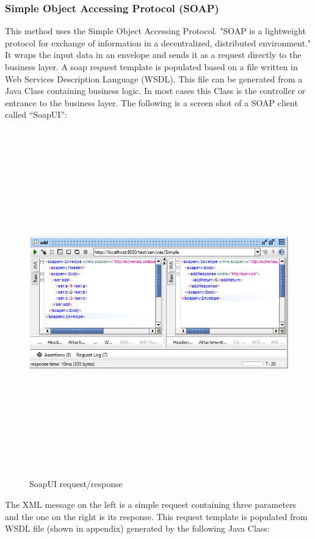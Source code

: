 \documentclass[12pt]{article}
\begin{document}
\subsubsection{Simple Object Accessing Protocol (SOAP)}
	This method uses the Simple Object Accessing Protocol. "SOAP is a lightweight protocol for exchange of information in a decentralized, distributed environment."\cite{soap} It wraps the input data in an envelope and sends it as a request directly to the business layer. A soap request template is populated based on a file written in Web Services Description Language (WSDL). This file can be generated from a Java Class containing business logic. In most cases this Class is the controller or entrance to the business layer. The following is a screen shot of a SOAP client called “SoapUI”:
	
\begin{figure}[ht!]
\centering
\includegraphics[width=15cm,height=15cm,keepaspectratio]{img/soapui.jpg}
\caption{SoapUI request/response}
\label{overflow}
\end{figure}

The XML message on the left is a simple request containing three parameters and the one on the right is its response. This request template is populated from WSDL file (shown in appendix) generated by the following Java Class:\\
\end{document}
